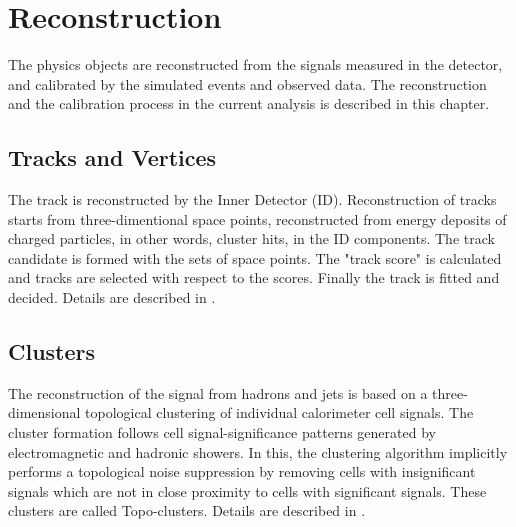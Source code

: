 \chapter{Reconstruction}
The physics objects are reconstructed from the signals measured in the detector, and calibrated by the simulated events and observed data. 
The reconstruction and the calibration process in the current analysis is described in this chapter.

\section{Tracks and Vertices}
The track is reconstructed by the Inner Detector (ID). Reconstruction of tracks starts from three-dimentional space points, reconstructed from energy deposits of charged particles, in other words, cluster hits, in the ID components. The track candidate is formed with the sets of space points. The "track score" is calculated and tracks are selected with respect to the scores. Finally the track is fitted and decided. 
Details are described in \cite{PERF-2015-08}.
\section{Clusters}
The reconstruction of the signal from hadrons and jets is based on a three-dimensional topological clustering of individual calorimeter cell signals.
The cluster formation follows cell signal-significance patterns generated by electromagnetic and hadronic showers. 
In this, the clustering algorithm implicitly performs a topological noise suppression by removing cells with insignificant signals which are not in close proximity to cells with significant signals. These clusters are called Topo-clusters. Details are described in \cite{PERF-2014-07}.
